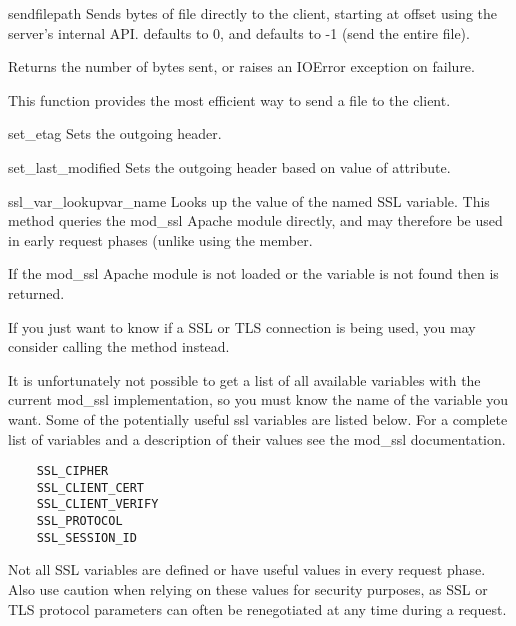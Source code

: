 \begin{methoddesc}[request]{sendfile}{path}
  Sends  bytes of file  directly to the client,
  starting at offset  using the server's internal
  API.  defaults to 0, and  defaults to -1 (send
  the entire file). 

  Returns the number of bytes sent, or raises an IOError exception
  on failure.

  This function provides the most efficient way to send a file to the
  client.
\end{methoddesc}

\begin{methoddesc}[request]{set_etag}{}
  Sets the outgoing  header.
\end{methoddesc}

\begin{methoddesc}[request]{set_last_modified}{}
  Sets the outgoing  header based on value of
   attribute.
\end{methoddesc}

\begin{methoddesc}[request]{ssl_var_lookup}{var_name}
  Looks up the value of the named SSL variable.  This method queries
  the mod_ssl Apache module directly, and may therefore be used in
  early request phases (unlike using the  member.

  If the mod_ssl Apache module is not loaded or the variable is not
  found then  is returned.

  If you just want to know if a SSL or TLS connection is being used,
  you may consider calling the  method instead.

  It is unfortunately not possible to get a list of all available
  variables with the current mod_ssl implementation, so you must know
  the name of the variable you want.  Some of the potentially useful
  ssl variables are listed below.  For a complete list of variables
  and a description of their values see the mod_ssl documentation.

  \begin{verbatim}
    SSL_CIPHER
    SSL_CLIENT_CERT
    SSL_CLIENT_VERIFY
    SSL_PROTOCOL
    SSL_SESSION_ID
  \end{verbatim}

  \begin{notice}
  Not all SSL variables are defined or have useful values in every
  request phase.  Also use caution when relying on these values for
  security purposes, as SSL or TLS protocol parameters can often be
  renegotiated at any time during a request.
  \end{notice}

\end{methoddesc}

